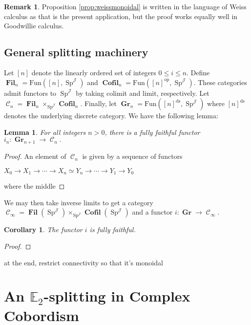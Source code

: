 \documentclass[reqno, oneside]{amsart}
\theoremstyle{definition}
\newtheorem{rmk}[nul]{Remark}
\theoremstyle{plain}
\newtheorem{lem}[nul]{Lemma}
\newtheorem{cor}{Corollary}[nul]
\DeclareMathOperator{\C}{\mathcal{C}}
\DeclareMathOperator{\Gr}{\textbf{Gr}}
\DeclareMathOperator{\Fil}{\textbf{Fil}}
\DeclareMathOperator{\Sp}{\text{Sp}}
\DeclareMathOperator{\J}{\mathcal{J}}
\DeclareMathOperator{\Cofil}{\textbf{Cofil}}
\begin{document}
\begin{rmk}
Proposition \ref{prop:weissmonoidal} is written in the language of Weiss calculus as that is the present application, but the proof works equally well in Goodwillie calculus.  
\end{rmk}



\subsection{General splitting machinery}


Let $[n]$ denote the linearly ordered set of integers $0\leq i\leq n$.  Define $\Fil_n = \text{Fun}([n], \Sp^{\J})$ and $\Cofil_n = \text{Fun}([n]^{\text{op}},\Sp^{\J})$.  These categories admit functors to $\Sp^{\J}$ by taking colimit and limit, respectively.  Let $\C_n = \Fil_n \times_{\Sp^{\J}} \Cofil_n.$  Finally, let $\Gr_n = \text{Fun}([n]^{\text{ds}}, \Sp^{\J})$ where $[n]^{\text{ds}}$ denotes the underlying discrete category.  We have the following lemma:

\begin{lem}
For all integers $n>0$, there is a fully faithful functor $i_n:\Gr_{n+1} \to \C_n.$  
\end{lem}
\begin{proof}
An element of $\C_n$ is given by a sequence of functors 
\begin{center}
$X_0 \longrightarrow X_1 \longrightarrow \cdots \longrightarrow X_n \simeq Y_n \longrightarrow \cdots \longrightarrow Y_1 \longrightarrow Y_0$ 
\end{center}
where the middle 
\end{proof}

We may then take inverse limits to get a category $\C_\infty = \Fil(\Sp^{\J}) \times_{\Sp^{\J}} \Cofil(\Sp^{\J})$ and a functor $i: \Gr \to \C_\infty$. 

\begin{cor}
The functor $i$ is fully faithful.
\end{cor}
\begin{proof}
\end{proof}

at the end, restrict connectivity so that it's monoidal

\section{An \texorpdfstring{$\mathbb{E}_2$}{E2}-splitting in Complex Cobordism} \label{sec:MUE2}
\end{document}
